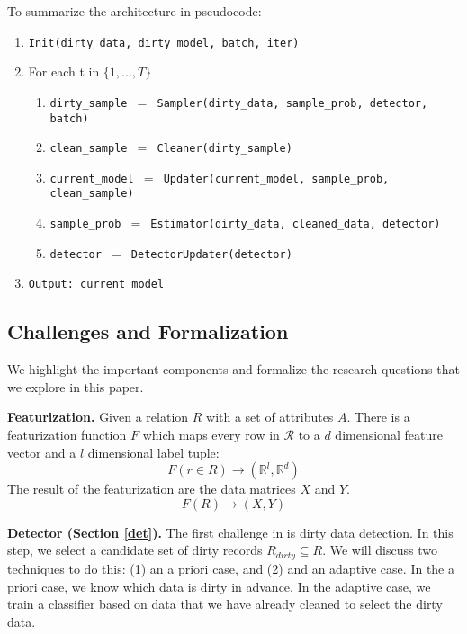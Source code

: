 To summarize the architecture in pseudocode:
\begin{enumerate}\scriptsize\sloppy
\item \texttt{Init(dirty\_data, dirty\_model, batch, iter)}
\item For each t in $\{1,...,T\}$
\begin{enumerate}
	\item \texttt{dirty\_sample $=$ Sampler(dirty\_data, sample\_prob, detector, batch)}
	\item \texttt{clean\_sample $=$ Cleaner(dirty\_sample)}
	\item \texttt{current\_model $=$ Updater(current\_model, sample\_prob, clean\_sample)}
	\item \texttt{sample\_prob $=$ Estimator(dirty\_data, cleaned\_data, detector)}
	\item \texttt{detector $=$ DetectorUpdater(detector)}
\end{enumerate}
\item \texttt{Output: current\_model}
\end{enumerate}

\subsection{Challenges and Formalization}
We highlight the important components and formalize the research questions that we explore in this paper. 

\vspace{0.5em}

\noindent \textbf{Featurization. } Given a relation $R$ with a set of attributes $A$.
There is a featurization function $F$ which maps every row in $\mathcal{R}$ to a $d$ dimensional feature vector and a $l$ dimensional label tuple: 
\[F(r \in R) \rightarrow (\mathbb{R}^l, \mathbb{R}^d)\]
The result of the featurization are the data matrices $X$ and $Y$.
\[
F(R)\rightarrow (X,Y)
\]

\vspace{0.5em}

\noindent\textbf{Detector (Section \ref{det}). } The first challenge in \sys is dirty data detection. In this step, we select a candidate set of dirty records $R_{dirty} \subseteq R$. We will discuss two techniques to do this: (1) an a priori case, and (2) and an adaptive case. In the a priori case, we know which data is dirty in advance. In the adaptive case, we train a classifier based on data that we have already cleaned to select the dirty data.

